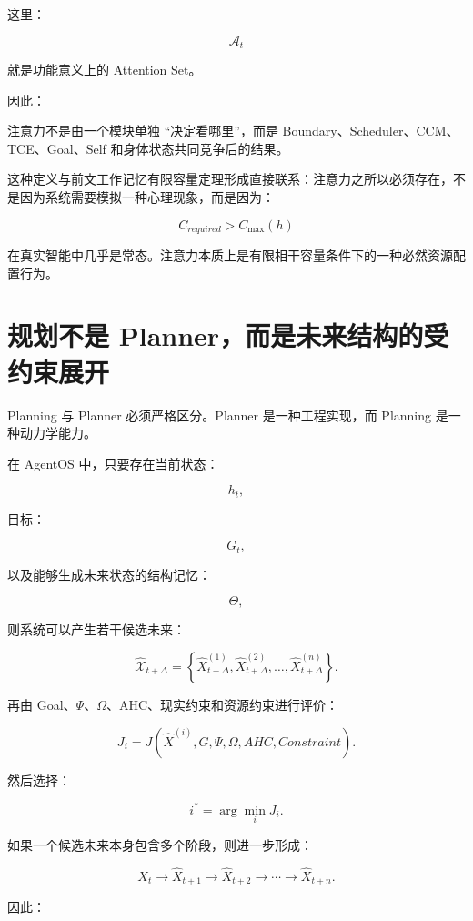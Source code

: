 这里：

\[
\mathcal A_t
\]

就是功能意义上的 Attention Set。

因此：

\begin{statementbox}
\centering
{}
\end{statementbox}

注意力不是由一个模块单独 ``决定看哪里''，而是 Boundary、Scheduler、CCM、TCE、Goal、Self 和身体状态共同竞争后的结果。

这种定义与前文工作记忆有限容量定理形成直接联系：注意力之所以必须存在，不是因为系统需要模拟一种心理现象，而是因为：

\[
\boxed{
C_{required}
>
C_{\max}(h)
}
\]

在真实智能中几乎是常态。注意力本质上是有限相干容量条件下的一种必然资源配置行为。

\section{规划不是 Planner，而是未来结构的受约束展开}

Planning 与 Planner 必须严格区分。Planner 是一种工程实现，而 Planning 是一种动力学能力。

在 AgentOS 中，只要存在当前状态：

\[
h_t,
\]

目标：

\[
G_t,
\]

以及能够生成未来状态的结构记忆：

\[
\Theta,
\]

则系统可以产生若干候选未来：

\[
\widehat{\mathcal X}_{t+\Delta}
=
\left\{
\hat X_{t+\Delta}^{(1)},
\hat X_{t+\Delta}^{(2)},
\ldots,
\hat X_{t+\Delta}^{(n)}
\right\}.
\]

再由 Goal、$\Psi$、$\Omega$、AHC、现实约束和资源约束进行评价：

\[
J_i
=
J(
\hat X^{(i)},
G,
\Psi,
\Omega,
AHC,
Constraint
).
\]

然后选择：

\[
i^\ast
=
\arg\min_i J_i.
\]

如果一个候选未来本身包含多个阶段，则进一步形成：

\[
X_t
\rightarrow
\hat X_{t+1}
\rightarrow
\hat X_{t+2}
\rightarrow
\cdots
\rightarrow
\hat X_{t+n}.
\]

因此：

